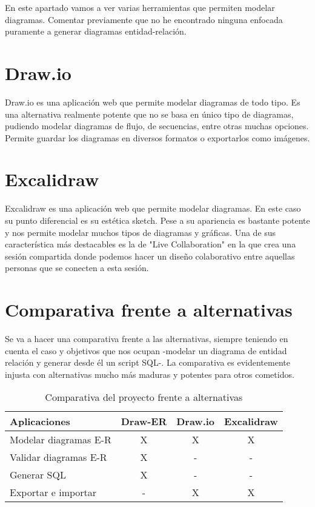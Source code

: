 
En este apartado vamos a ver varias herramientas que permiten modelar diagramas. Comentar previamente que no he encontrado ninguna enfocada puramente a generar diagramas entidad-relación.

\section{Draw.io}
Draw.io \cite{draw-io} es una aplicación web que permite modelar diagramas de todo tipo. Es una alternativa realmente potente que no se basa en único tipo de diagramas, pudiendo modelar diagramas de flujo, de secuencias, entre otras muchas opciones.
Permite guardar los diagramas en diversos formatos o exportarlos como imágenes.
\section{Excalidraw}
Excalidraw \cite{excalidraw} es una aplicación web que permite modelar diagramas. En este caso su punto diferencial es su estética sketch. Pese a su apariencia es bastante potente y nos permite modelar muchos tipos de diagramas y gráficas.
Una de sus característica más destacables es la de "Live Collaboration" en la que crea una sesión compartida donde podemos hacer un diseño colaborativo entre aquellas personas que se conecten a esta sesión.

\section{Comparativa frente a alternativas}
Se va a hacer una comparativa frente a las alternativas, siempre teniendo en cuenta el caso y objetivos que nos ocupan -modelar un diagrama de entidad relación y generar desde él un script SQL-.
La comparativa es evidentemente injusta con alternativas mucho más maduras y potentes para otros cometidos.

\begin{table}[h]
\centering
\begin{tabular}{l c c c}
\hline
\multicolumn{1}{l}{Aplicaciones} & \textbf{Draw-ER} & \textbf{Draw.io} & \textbf{Excalidraw} \\
\hline
Modelar diagramas E-R & X & X & X \\
Validar diagramas E-R & X & - & - \\
Generar SQL & X & - & - \\
Exportar e importar & - & X & X \\
\hline
\end{tabular}
\caption{Comparativa del proyecto frente a alternativas}
\label{alternativas}
\end{table}

